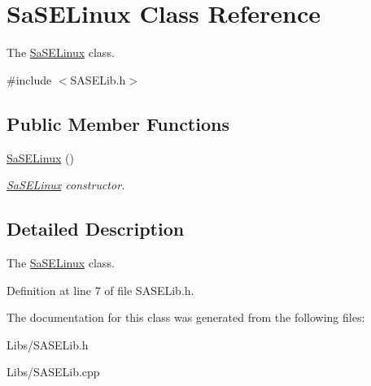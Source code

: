 \hypertarget{class_sa_s_e_linux}{}\section{Sa\+S\+E\+Linux Class Reference}
\label{class_sa_s_e_linux}


The \mbox{\hyperlink{class_sa_s_e_linux}{Sa\+S\+E\+Linux}} class.  




{\ttfamily \#include $<$S\+A\+S\+E\+Lib.\+h$>$}

\subsection*{Public Member Functions}
\begin{DoxyCompactItemize}
\item 
\mbox{\label{class_sa_s_e_linux_a9c6146318aa05f8dda018bcb09a2d2b4}} 
\mbox{\hyperlink{class_sa_s_e_linux_a9c6146318aa05f8dda018bcb09a2d2b4}{Sa\+S\+E\+Linux}} ()
\begin{DoxyCompactList}\small\item\em \mbox{\hyperlink{class_sa_s_e_linux}{Sa\+S\+E\+Linux}} constructor. \end{DoxyCompactList}\end{DoxyCompactItemize}


\subsection{Detailed Description}
The \mbox{\hyperlink{class_sa_s_e_linux}{Sa\+S\+E\+Linux}} class. 

Definition at line 7 of file S\+A\+S\+E\+Lib.\+h.



The documentation for this class was generated from the following files\+:\begin{DoxyCompactItemize}
\item 
Libs/S\+A\+S\+E\+Lib.\+h\item 
Libs/S\+A\+S\+E\+Lib.\+cpp\end{DoxyCompactItemize}
